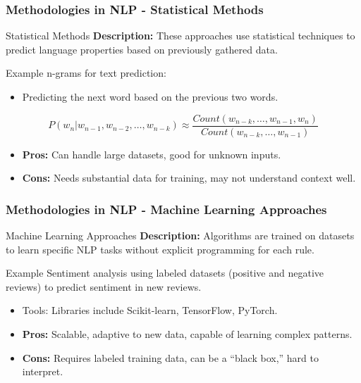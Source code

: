 \documentclass[aspectratio=169]{beamer}
\begin{document}
\begin{frame}[fragile]
    \frametitle{Methodologies in NLP - Statistical Methods}
    \begin{block}{Statistical Methods}
        \textbf{Description:} These approaches use statistical techniques to predict language properties based on previously gathered data.
    \end{block}
    \begin{exampleblock}{Example}
        n-grams for text prediction:
        \begin{itemize}
            \item Predicting the next word based on the previous two words.
        \end{itemize}
    \end{exampleblock}
    \begin{equation}
        P(w_n | w_{n-1}, w_{n-2}, \ldots, w_{n-k}) \approx \frac{Count(w_{n-k}, \ldots, w_{n-1}, w_n)}{Count(w_{n-k}, \ldots, w_{n-1})}
    \end{equation}
    \begin{itemize}
        \item \textbf{Pros:} Can handle large datasets, good for unknown inputs.
        \item \textbf{Cons:} Needs substantial data for training, may not understand context well.
    \end{itemize}
\end{frame}

\begin{frame}[fragile]
    \frametitle{Methodologies in NLP - Machine Learning Approaches}
    \begin{block}{Machine Learning Approaches}
        \textbf{Description:} Algorithms are trained on datasets to learn specific NLP tasks without explicit programming for each rule.
    \end{block}
    \begin{exampleblock}{Example}
        Sentiment analysis using labeled datasets (positive and negative reviews) to predict sentiment in new reviews.
        \begin{itemize}
            \item Tools: Libraries include Scikit-learn, TensorFlow, PyTorch.
        \end{itemize}
    \end{exampleblock}
    \begin{itemize}
        \item \textbf{Pros:} Scalable, adaptive to new data, capable of learning complex patterns.
        \item \textbf{Cons:} Requires labeled training data, can be a “black box,” hard to interpret.
    \end{itemize}
\end{frame}
\end{document}
